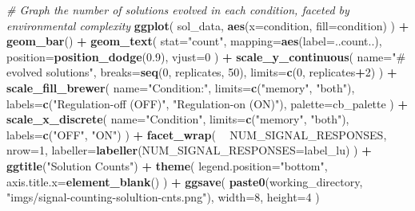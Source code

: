 \documentclass[]{book}
\newenvironment{Shaded}{\begin{snugshade}}{\end{snugshade}}
\newcommand{\CommentTok}[1]{\textcolor[rgb]{0.56,0.35,0.01}{\textit{#1}}}
\newcommand{\DataTypeTok}[1]{\textcolor[rgb]{0.13,0.29,0.53}{#1}}
\newcommand{\DecValTok}[1]{\textcolor[rgb]{0.00,0.00,0.81}{#1}}
\newcommand{\FloatTok}[1]{\textcolor[rgb]{0.00,0.00,0.81}{#1}}
\newcommand{\KeywordTok}[1]{\textcolor[rgb]{0.13,0.29,0.53}{\textbf{#1}}}
\newcommand{\NormalTok}[1]{#1}
\newcommand{\OperatorTok}[1]{\textcolor[rgb]{0.81,0.36,0.00}{\textbf{#1}}}
\newcommand{\StringTok}[1]{\textcolor[rgb]{0.31,0.60,0.02}{#1}}
\begin{document}
\begin{Shaded}
\begin{Highlighting}[]
\CommentTok{# Graph the number of solutions evolved in each condition, faceted by environmental complexity}
\KeywordTok{ggplot}\NormalTok{( sol_data, }\KeywordTok{aes}\NormalTok{(}\DataTypeTok{x=}\NormalTok{condition, }\DataTypeTok{fill=}\NormalTok{condition) ) }\OperatorTok{+}
\StringTok{  }\KeywordTok{geom_bar}\NormalTok{() }\OperatorTok{+}
\StringTok{  }\KeywordTok{geom_text}\NormalTok{(}
    \DataTypeTok{stat=}\StringTok{"count"}\NormalTok{,}
    \DataTypeTok{mapping=}\KeywordTok{aes}\NormalTok{(}\DataTypeTok{label=}\NormalTok{..count..),}
    \DataTypeTok{position=}\KeywordTok{position_dodge}\NormalTok{(}\FloatTok{0.9}\NormalTok{),}
    \DataTypeTok{vjust=}\DecValTok{0}
\NormalTok{  ) }\OperatorTok{+}
\StringTok{  }\KeywordTok{scale_y_continuous}\NormalTok{(}
    \DataTypeTok{name=}\StringTok{"# evolved solutions"}\NormalTok{,}
    \DataTypeTok{breaks=}\KeywordTok{seq}\NormalTok{(}\DecValTok{0}\NormalTok{, replicates, }\DecValTok{50}\NormalTok{),}
    \DataTypeTok{limits=}\KeywordTok{c}\NormalTok{(}\DecValTok{0}\NormalTok{, replicates}\OperatorTok{+}\DecValTok{2}\NormalTok{)}
\NormalTok{  ) }\OperatorTok{+}
\StringTok{  }\KeywordTok{scale_fill_brewer}\NormalTok{(}
    \DataTypeTok{name=}\StringTok{"Condition:"}\NormalTok{,}
    \DataTypeTok{limits=}\KeywordTok{c}\NormalTok{(}\StringTok{"memory"}\NormalTok{, }\StringTok{"both"}\NormalTok{),}
    \DataTypeTok{labels=}\KeywordTok{c}\NormalTok{(}\StringTok{"Regulation-off (OFF)"}\NormalTok{, }\StringTok{"Regulation-on (ON)"}\NormalTok{),}
    \DataTypeTok{palette=}\NormalTok{cb_palette}
\NormalTok{  ) }\OperatorTok{+}
\StringTok{  }\KeywordTok{scale_x_discrete}\NormalTok{(}
    \DataTypeTok{name=}\StringTok{"Condition"}\NormalTok{,}
    \DataTypeTok{limits=}\KeywordTok{c}\NormalTok{(}\StringTok{"memory"}\NormalTok{, }\StringTok{"both"}\NormalTok{),}
    \DataTypeTok{labels=}\KeywordTok{c}\NormalTok{(}\StringTok{"OFF"}\NormalTok{, }\StringTok{"ON"}\NormalTok{)}
\NormalTok{  ) }\OperatorTok{+}
\StringTok{  }\KeywordTok{facet_wrap}\NormalTok{(}
    \OperatorTok{~}\StringTok{ }\NormalTok{NUM_SIGNAL_RESPONSES,}
    \DataTypeTok{nrow=}\DecValTok{1}\NormalTok{,}
    \DataTypeTok{labeller=}\KeywordTok{labeller}\NormalTok{(}\DataTypeTok{NUM_SIGNAL_RESPONSES=}\NormalTok{label_lu)}
\NormalTok{  ) }\OperatorTok{+}
\StringTok{  }\KeywordTok{ggtitle}\NormalTok{(}\StringTok{"Solution Counts"}\NormalTok{) }\OperatorTok{+}
\StringTok{  }\KeywordTok{theme}\NormalTok{(}
    \DataTypeTok{legend.position=}\StringTok{"bottom"}\NormalTok{,}
    \DataTypeTok{axis.title.x=}\KeywordTok{element_blank}\NormalTok{()}
\NormalTok{  ) }\OperatorTok{+}
\StringTok{  }\KeywordTok{ggsave}\NormalTok{(}
    \KeywordTok{paste0}\NormalTok{(working_directory, }\StringTok{"imgs/signal-counting-solultion-cnts.png"}\NormalTok{),}
    \DataTypeTok{width=}\DecValTok{8}\NormalTok{,}
    \DataTypeTok{height=}\DecValTok{4}
\NormalTok{  )}
\end{Highlighting}
\end{Shaded}
\end{document}
